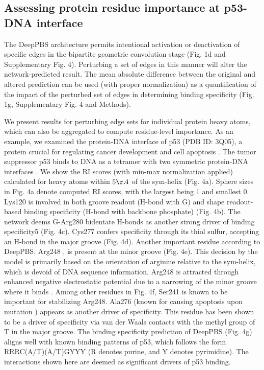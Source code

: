 \subsection{Assessing protein residue importance at p53-DNA interface}
The DeepPBS architecture permits intentional activation or deactivation of specific edges in the bipartite geometric convolution stage (Fig. 1d and Supplementary Fig. 4). Perturbing a set of edges in this manner will alter the network-predicted result. The mean absolute difference between the original and altered prediction can be used (with proper normalization) as a quantification of the impact of the perturbed set of edges in determining binding specificity (Fig. 1g, Supplementary Fig. 4 and Methods).
\par
We present results for perturbing edge sets for individual protein heavy atoms, which can also be aggregated to compute residue-level importance. As an example, we examined the protein-DNA interface of p53 (PDB ID: 3Q05), a protein crucial for regulating cancer development and cell apoptosis \citep{Joerger2008}. The tumor suppressor p53 binds to DNA as a tetramer with two symmetric protein-DNA interfaces \citep{Kitayner2010, Petty2011}. We show the RI scores (with min-max normalization applied) calculated for heavy atoms within $5\AA$ of the sym-helix (Fig. 4a). Sphere sizes in Fig. 4a denote computed RI scores, with the largest being 1 and smallest 0. Lys120 \citep{Kitayner2006} is involved in both groove readout (H-bond with G) and shape readout-based binding specificity (H-bond with backbone phosphate) (Fig. 4b). The network deems G-Arg280 \citep{Kitayner2006} bidentate H-bonds as another strong driver of binding specificity5 (Fig. 4c). Cys277 confers specificity through its thiol sulfur, accepting an H-bond in the major groove \citep{Kitayner2006} (Fig. 4d). Another important residue according to DeepPBS, Arg248 \citep{Barakat2011}, is present at the minor groove (Fig. 4e). This decision by the model is primarily based on the orientation of arginine relative to the sym-helix, which is devoid of DNA sequence information. Arg248 is attracted through enhanced negative electrostatic potential due to a narrowing of the minor groove where it binds \citep{Kitayner2010}. Among other residues in Fig. 4f, Ser241 is known \citep{Barakat2011} to be important for stabilizing Arg248. Ala276 (known for causing apoptosis upon mutation \citep{Reaz2013}) appears as another driver of specificity. This residue has been shown to be a driver of specificity via van der Waals contacts with the methyl group of T in the major groove\citep{Kitayner2006}. The binding specificity prediction of DeepPBS (Fig. 4g) aligns well with known binding patterns of p53, which follows the form RRRC(A/T)(A/T)GYYY (R denotes purine, and Y denotes pyrimidine). The interactions shown here are deemed \citep{Joerger2008, Vousden2009} as significant drivers of p53 binding.

